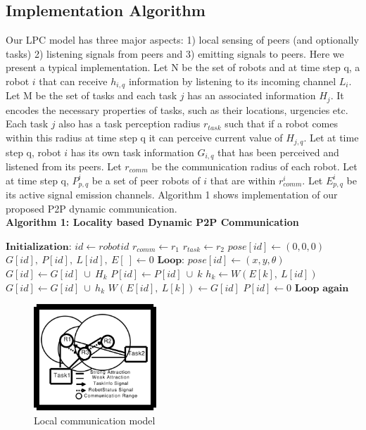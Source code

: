 \documentclass[letterpaper, 10 pt, conference]{ieeeconf}  %
\begin{document}
\subsection{Implementation Algorithm}
Our LPC model has three major aspects: 1) local sensing of peers (and optionally tasks) 2) listening signals from peers and 3) emitting signals to peers. Here we present a typical implementation.
Let N be the set of robots and at time step q, a robot $i$ that can receive  $h_{i,q}$ information by listening to its incoming channel $L_i$. Let M be the set of tasks and each task $j$ has an associated information $H_j$. It encodes the necessary properties of tasks, such as their locations, urgencies etc. Each task $j$ also has a task perception radius $r_{task}$ such that if a robot comes within this radius at time step q it can perceive current value of $H_{j,q}$. Let at time step q, robot $i$ has its own task information $G_{i, q}$ that has been perceived and listened from its peers. Let $r_{comm}$ be the communication radius of each robot. Let at time step q, $P_{p, q}^{i}$ be a set of peer robots of $i$ that are within $r_{comm}^{i}$. Let $E_{p, q}^{i}$ be its active signal emission channels. Algorithm 1
shows implementation of our proposed P2P dynamic communication.\\ 
% 
\textbf{\small Algorithm 1: Locality based Dynamic P2P Communication}
\begin{algorithmic}[1]
\label{alg:p2p-comm}
\State $\textbf{Initialization:}$
\State $id \gets robotid$
\State $r_{comm} \gets r_1$
\State $r_{task} \gets r_2$
\State $pose[id] \gets (0, 0, 0)$
\State $G[id], ~P[id], ~L[id], ~E[~] \gets 0$
\State $\textbf{Loop:}$
\State $pose[id] \gets (x, y, \theta)$
\State $G[id] \gets G[id] ~\cup ~ H_k$
\EndIf
\State $P[id] \gets P[id] ~ \cup ~ k$
\State $h_k \gets W(E[k],~ L[id])$
\State $G[id] \gets G[id] ~ \cup ~ h_k$
\EndIf
\State $ W(E[id],~L[k]) \gets G[id]$
\EndFor
\State $P[id] \gets 0$
\State $\textbf{Loop again}$
\end{algorithmic}
\begin{figure}[thpb]
\centering
\includegraphics[height=4cm, angle=0]{../dia-files/LocalComm.eps}
\caption{Local communication model}
\label{fig:lcm} %
\end{figure}
\end{document}
